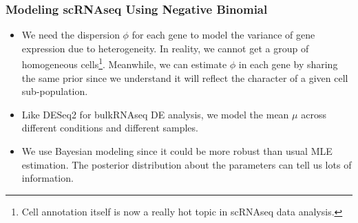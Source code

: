 \begin{frame}
  \frametitle{Modeling scRNAseq Using Negative Binomial}
  \begin{itemize}
  \item
    We need the dispersion \(\phi\) for each gene to model the variance of gene
    expression 
    due to heterogeneity. In reality, we cannot get a group of homogeneous
    cells\footnote{Cell annotation itself is now a really hot topic in scRNAseq
      data analysis.}. Meanwhile, we can estimate \(\phi\) in each gene by sharing
    the same prior since we understand it will reflect the character of a given
    cell sub-population.
  \item
    Like DESeq2 \cite{love2014moderated} for bulkRNAseq DE analysis, we model
    the mean \(\mu\) across different conditions and different samples.
  \item
    We use Bayesian modeling since it could be more robust than usual MLE
    estimation. The posterior distribution about the parameters can tell us lots
    of information.
  \end{itemize}
\end{frame}